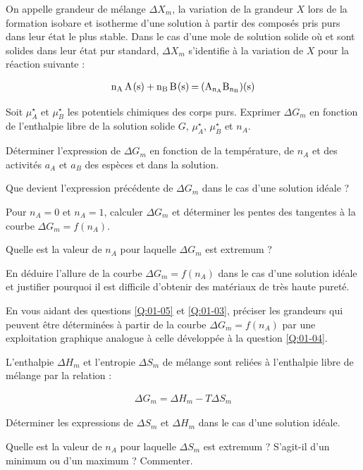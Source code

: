 On appelle grandeur de mélange $\Delta X_m$, la variation de la grandeur $X$ lors de la formation isobare et isotherme d'une solution à partir des composés pris purs dans leur état le plus stable. Dans le cas d'une mole de solution solide où  et  sont solides dans leur état pur standard, $\Delta X_m$ s'identifie à la variation de $X$ pour la réaction suivante :

\begin{align*}
\ce{n_A A(s) + n_B B(s) = (A_{n_A}B_{n_B})(s)}
\end{align*}

\Q \label{Q:01-05} Soit $\mu_A^\star$ et $\mu_B^\star$ les potentiels chimiques des corps purs. Exprimer $\Delta G_m$ en fonction de l'enthalpie libre de la solution solide $G$, $\mu_A^\star$, $\mu_B^\star$ et $n_A$.

\Q Déterminer l'expression de $\Delta G_m$ en fonction de la température, de $n_A$ et des activités $a_A$ et $a_B$ des espèces  et  dans la solution.

\Q Que devient l'expression précédente de $\Delta G_m$ dans le cas d'une solution idéale ?

Pour $n_A = 0$ et $n_A = 1$, calculer $\Delta G_m$ et déterminer les pentes des tangentes à la courbe $\Delta G_m = f(n_A)$.

Quelle est la valeur de $n_A$ pour laquelle $\Delta G_m$ est extremum ?

\Q En déduire l'allure de la courbe $\Delta G_m = f( n_A )$ dans le cas d'une solution idéale et justifier pourquoi il est difficile d'obtenir des matériaux de très haute pureté.

En vous aidant des questions \ref{Q:01-05} et \ref{Q:01-03}, préciser les grandeurs qui peuvent être déterminées à partir de la courbe $\Delta G_m  = f ( n_A )$ par une exploitation graphique analogue à celle développée à la question \ref{Q:01-04}.

L'enthalpie $\Delta H_m$ et l'entropie $\Delta S_m$ de mélange sont reliées à l'enthalpie libre de mélange par la relation :

\begin{align*}
\Delta G_m = \Delta H_m - T \Delta S_m
\end{align*}

\Q Déterminer les expressions de $\Delta S_m$ et $\Delta H_m$ dans le cas d'une solution idéale.

Quelle est la valeur de $n_A$ pour laquelle $\Delta S_m$ est extremum ? S'agit-il d'un minimum ou d'un
maximum ? Commenter.

